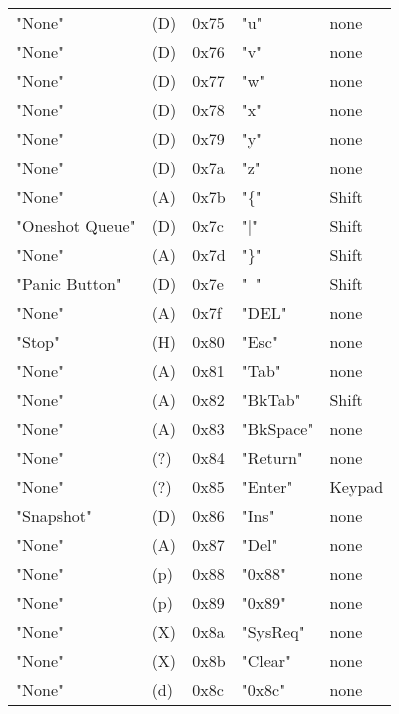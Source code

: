 \begin{table}[htb]
\begin{tabular}{l l l l l}
        "None"               & (D)  &  0x75   & "u"          & none \\
        "None"               & (D)  &  0x76   & "v"          & none \\
        "None"               & (D)  &  0x77   & "w"          & none \\
        "None"               & (D)  &  0x78   & "x"          & none \\
        "None"               & (D)  &  0x79   & "y"          & none \\
        "None"               & (D)  &  0x7a   & "z"          & none \\
        "None"               & (A)  &  0x7b   & "\{"         & Shift \\
        "Oneshot Queue"      & (D)  &  0x7c   & "|"          & Shift \\
        "None"               & (A)  &  0x7d   & "\}"          & Shift \\
        "Panic Button"       & (D)  &  0x7e   & "~"          & Shift \\
        "None"               & (A)  &  0x7f   & "DEL"        & none \\
        "Stop"               & (H)  &  0x80   & "Esc"        & none \\
        "None"               & (A)  &  0x81   & "Tab"        & none \\
        "None"               & (A)  &  0x82   & "BkTab"      & Shift \\
        "None"               & (A)  &  0x83   & "BkSpace"    & none \\
        "None"               & (?)  &  0x84   & "Return"     & none \\
        "None"               & (?)  &  0x85   & "Enter"      & Keypad \\
        "Snapshot"           & (D)  &  0x86   & "Ins"        & none \\
        "None"               & (A)  &  0x87   & "Del"        & none \\
        "None"               & (p)  &  0x88   & "0x88"       & none \\
        "None"               & (p)  &  0x89   & "0x89"       & none \\
        "None"               & (X)  &  0x8a   & "SysReq"     & none \\
        "None"               & (X)  &  0x8b   & "Clear"      & none \\
        "None"               & (d)  &  0x8c   & "0x8c"       & none \\

\end{tabular}
\end{table}
